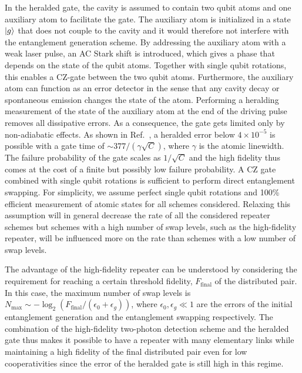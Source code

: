 In the heralded gate, the cavity is assumed to contain two qubit atoms and one
auxiliary atom to facilitate the gate. The auxiliary atom is initialized in a
state $| g \rangle$ that does not couple to the cavity and it would therefore not
interfere with the entanglement generation scheme. By addressing the auxiliary
atom with a weak laser pulse, an AC Stark shift is introduced, which gives a
phase that depends on the state of the qubit atoms. Together with single qubit
rotations, this enables a CZ-gate between the two qubit atoms. Furthermore, the
auxiliary atom can function as an error detector in the sense that any cavity
decay or spontaneous emission changes the state of the atom. Performing a
heralding measurement of the state of the auxiliary atom at the end of the
driving pulse removes all dissipative errors. As a consequence, the gate gets
limited only by non-adiabatic effects. As shown in Ref.~\cite{Borregaard2015a}, a
heralded error below $4\times 10^{-5}$ is possible with a gate time of
$\sim377/(\gamma\sqrt{C})$, where $\gamma$ is the atomic linewidth. The failure
probability of the gate scales as $1/\sqrt{C}$ and the high fidelity thus comes
at the cost of a finite but possibly low failure probability. A CZ gate combined
with single qubit rotations is sufficient to perform direct entanglement
swapping. For simplicity, we assume perfect single qubit rotations and 100\%
efficient measurement of atomic states for all schemes considered. Relaxing this
assumption will in general decrease the rate of all the considered repeater
schemes but schemes with a high number of swap levels, such as the high-fidelity
repeater, will be influenced more on the rate than schemes with a low number of
swap levels.

The advantage of the high-fidelity repeater can be understood by considering the
requirement for reaching a certain threshold fidelity, $F_{\mathrm{final}}$ of the
distributed pair. In this case, the maximum number of swap levels is
$N_\mathrm{max}\sim -\log_{2}(F_{\mathrm{final}}/(\epsilon_{0}+\epsilon_{g}))$,
where $\epsilon_{0},\epsilon_{g}\ll1$ are the errors of the initial entanglement
generation and the entanglement swapping respectively. The combination of the
high-fidelity two-photon detection scheme and the heralded gate thus makes it
possible to have a repeater with many elementary links while maintaining a high
fidelity of the final distributed pair even for low cooperativities since the
error of the heralded gate is still high in this regime.

